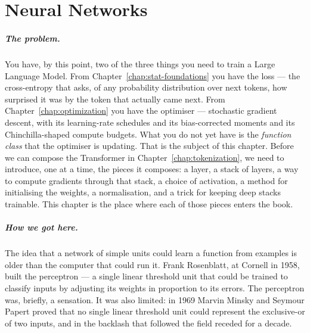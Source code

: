 
\chapter{Neural Networks}
\label{chap:neural-networks}
\label{sec:neural-networks}

\scenelabel
\begin{scenestrip}
\end{scenestrip}

\paragraph{The problem.}
You have, by this point, two of the three things you need to train
a Large Language Model. From Chapter~\ref{chap:stat-foundations} you have the loss --- the
cross-entropy that asks, of any probability distribution over next
tokens, how surprised it was by the token that actually came next.
From Chapter~\ref{chap:optimization} you have the optimiser --- stochastic gradient
descent, with its learning-rate schedules and its bias-corrected
moments and its Chinchilla-shaped compute budgets. What you do not
yet have is the \emph{function class} that the optimiser is
updating. That is the subject of this chapter. Before we can
compose the Transformer in Chapter~\ref{chap:tokenization}, we need to introduce, one at
a time, the pieces it composes: a layer, a stack of layers, a way
to compute gradients through that stack, a choice of activation, a
method for initialising the weights, a normalisation, and a trick
for keeping deep stacks trainable. This chapter is the place where
each of those pieces enters the book.

\paragraph{How we got here.}
The idea that a network of simple units could learn a function from
examples is older than the computer that could run it. Frank
Rosenblatt, at Cornell in 1958, built the perceptron --- a single
linear threshold unit that could be trained to classify inputs by
adjusting its weights in proportion to its errors. The perceptron
was, briefly, a sensation. It was also limited: in 1969 Marvin
Minsky and Seymour Papert proved that no single linear threshold
unit could represent the exclusive-or of two inputs, and in the
backlash that followed the field receded for a decade.

